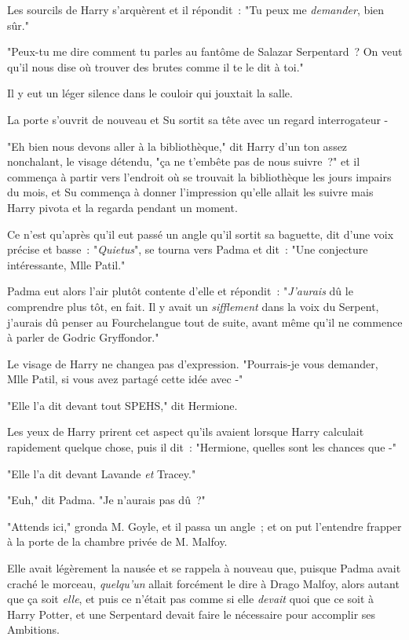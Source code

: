 Les sourcils de Harry s'arquèrent et il répondit~: "Tu peux me \emph{demander}, bien sûr."

"Peux-tu me dire comment tu parles au fantôme de Salazar Serpentard~? On veut qu'il nous dise où trouver des brutes comme il te le dit à toi."

Il y eut un léger silence dans le couloir qui jouxtait la salle.

La porte s'ouvrit de nouveau et Su sortit sa tête avec un regard interrogateur -

"Eh bien nous devons aller à la bibliothèque," dit Harry d'un ton assez nonchalant, le visage détendu, "ça ne t'embête pas de nous suivre~?" et il commença à partir vers l'endroit où se trouvait la bibliothèque les jours impairs du mois, et Su commença à donner l'impression qu'elle allait les suivre mais Harry pivota et la regarda pendant un moment.

Ce n'est qu'après qu'il eut passé un angle qu'il sortit sa baguette, dit d'une voix précise et basse~: "\emph{Quietus}", se tourna vers Padma et dit~: "Une conjecture intéressante, Mlle Patil."

Padma eut alors l'air plutôt contente d'elle et répondit~: "\emph{J'aurais} dû le comprendre plus tôt, en fait. Il y avait un \emph{sifflement} dans la voix du Serpent, j'aurais dû penser au Fourchelangue tout de suite, avant même qu'il ne commence à parler de Godric Gryffondor."

Le visage de Harry ne changea pas d'expression. "Pourrais-je vous demander, Mlle Patil, si vous avez partagé cette idée avec -"

"Elle l'a dit devant tout SPEHS," dit Hermione.

Les yeux de Harry prirent cet aspect qu'ils avaient lorsque Harry calculait rapidement quelque chose, puis il dit~: "Hermione, quelles sont les chances que -"

"Elle l'a dit devant Lavande \emph{et} Tracey."

"Euh," dit Padma. "Je n'aurais pas dû~?"

\later

"Attends ici," gronda M. Goyle, et il passa un angle~; et on put l'entendre frapper à la porte de la chambre privée de M. Malfoy.

Elle avait légèrement la nausée et se rappela à nouveau que, puisque Padma avait craché le morceau, \emph{quelqu'un} allait forcément le dire à Drago Malfoy, alors autant que ça soit \emph{elle}, et puis ce n'était pas comme si elle \emph{devait} quoi que ce soit à Harry Potter, et une Serpentard devait faire le nécessaire pour accomplir ses Ambitions.

